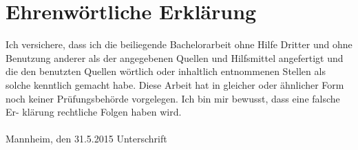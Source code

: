 \documentclass[11pt,titlepage,oneside,openany,a4paper]{report}
\begin{document}





\newpage

\pagestyle{empty}


\section*{Ehrenw\"ortliche Erkl\"arung}
Ich versichere, dass ich die beiliegende Bachelorarbeit ohne Hilfe Dritter
und ohne Benutzung anderer als der angegebenen Quellen und Hilfsmittel
angefertigt und die den benutzten Quellen w\"ortlich oder inhaltlich
entnommenen Stellen als solche kenntlich gemacht habe. Diese Arbeit
hat in gleicher oder \"ahnlicher Form noch keiner Pr\"ufungsbeh\"orde
vorgelegen. Ich bin mir bewusst, dass eine falsche Er- kl\"arung rechtliche Folgen haben
wird.
\\
\\

\noindent
Mannheim, den 31.5.2015 \hspace{4cm} Unterschrift
\end{document}
